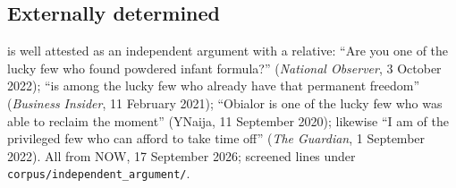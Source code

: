 \documentclass[12pt]{article}
\begin{document}
\subsection{Externally determined }

 is well attested as an independent argument with a relative: \enquote{Are you one of the lucky few who found powdered infant formula?} (\textit{National Observer}, 3 October 2022); \enquote{is among the lucky few who already have that permanent freedom} (\textit{Business Insider}, 11 February 2021); \enquote{Obialor is one of the lucky few who was able to reclaim the moment} (YNaija, 11 September 2020); likewise \enquote{I am of the privileged few who can afford to take time off} (\textit{The Guardian}, 1 September 2022). All from NOW, 17 September 2026; screened lines under \texttt{corpus/independent\_argument/}.

\printbibliography
\end{document}
